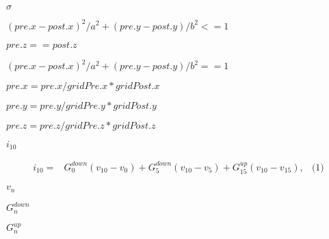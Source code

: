 \documentclass{article}
\begin{document}
$\sigma$
\pagebreak

$ (pre.x-post.x)^2/a^2 + (pre.y-post.y)/b^2 <= 1 $
\pagebreak

$pre.z==post.z$
\pagebreak

$ (pre.x-post.x)^2/a^2 + (pre.y-post.y)/b^2 == 1$
\pagebreak

$ pre.x = pre.x / gridPre.x * gridPost.x $
\pagebreak

$ pre.y = pre.y / gridPre.y * gridPost.y $
\pagebreak

$ pre.z = pre.z / gridPre.z * gridPost.z $
\pagebreak

$i_{10}$
\pagebreak

\begin{align*} i_{10} = & G_0^{down} (v_{10} - v_{0}) + G_5^{down} (v_{10} - v_{5}) + G_{15}^{up} (v_{10} - v_{15}), & \text{(1)} \end{align*}
\pagebreak

$v_n$
\pagebreak

$G_n^{down}$
\pagebreak

$G_n^{up}$
\pagebreak
\end{document}
